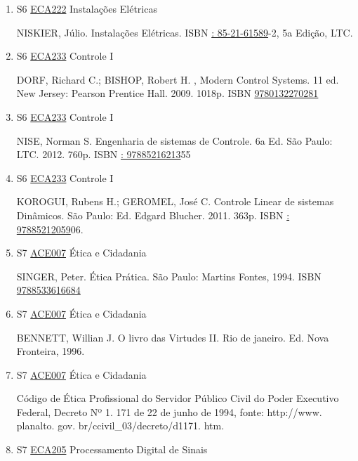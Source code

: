 \documentclass[12pt,a4paper]{book}
\begin{document}
\begin{enumerate}
 NISKIER, Júlio.  Instalações Elétricas.  ISBN \href{http://www.google.com/search?hl=pt-BR&tbo=p&tbm=bks&q=isbn:: 85-21-61589&num=10}{: 85-21-61589}-2, 5a Edição, LTC.
 \item S6 \hyperref[PUD:ECA222]{ECA222} Instalações Elétricas

 NISKIER, Júlio.  Instalações Elétricas.  ISBN \href{http://www.google.com/search?hl=pt-BR&tbo=p&tbm=bks&q=isbn:: 85-21-61589&num=10}{: 85-21-61589}-2, 5a Edição, LTC.
 \item S6 \hyperref[PUD:ECA233]{ECA233} Controle I

 DORF, Richard C.;  BISHOP, Robert H. , Modern Control Systems.  11 ed.  New Jersey: Pearson Prentice Hall.  2009.  1018p.  ISBN \href{http://www.isbnsearch.org/isbn/9780132270281}{9780132270281}
 
 
 \item S6 \hyperref[PUD:ECA233]{ECA233} Controle I

 NISE, Norman S.  Engenharia de sistemas de Controle.  6a Ed.  São Paulo: LTC.  2012.  760p.  ISBN \href{http://www.google.com/search?hl=pt-BR&tbo=p&tbm=bks&q=isbn:: 97885216213&num=10}{: 97885216213}55
 
 
 \item S6 \hyperref[PUD:ECA233]{ECA233} Controle I

 KOROGUI, Rubens H.;  GEROMEL, José C.  Controle Linear de sistemas Dinâmicos. São Paulo: Ed. Edgard Blucher.  2011.  363p.  ISBN \href{http://www.google.com/search?hl=pt-BR&tbo=p&tbm=bks&q=isbn:: 97885212059&num=10}{: 97885212059}06.
 \item S7 \hyperref[PUD:ACE007]{ACE007} Ética e Cidadania

  SINGER, Peter.  Ética Prática.  São Paulo: Martins Fontes, 1994.  ISBN \href{http://www.bn.br/site/pages/servicosProfissionais/agenciaISBN/isbnBusca/FbnBuscaISBNCatalogo.asp?pField=ISBN&pIntPagina=1&pISBN=33616684&nidbISBN=true&hidbISBN=true}{9788533616684}
 
 
 \item S7 \hyperref[PUD:ACE007]{ACE007} Ética e Cidadania

   BENNETT, Willian J.  O livro das Virtudes II.  Rio de janeiro.  Ed.  Nova Fronteira, 1996. 
 
 
 \item S7 \hyperref[PUD:ACE007]{ACE007} Ética e Cidadania

  Código de Ética Profissional do Servidor Público Civil do Poder Executivo Federal, Decreto Nº 1. 171 de 22 de junho de 1994, fonte: http://www. planalto. gov. br/ccivil_03/decreto/d1171. htm.
 \item S7 \hyperref[PUD:ECA205]{ECA205} Processamento Digital de Sinais


\end{enumerate}
\end{document}
